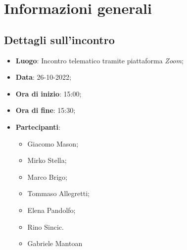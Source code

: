 \section{Informazioni generali}

\subsection{Dettagli sull'incontro}
\begin{itemize}
\item \textbf{Luogo}: Incontro telematico tramite piattaforma \textit{Zoom};
\item \textbf{Data}: 26-10-2022;
\item \textbf{Ora di inizio}: 15:00;
\item \textbf{Ora di fine}: 15:30;
\item \textbf{Partecipanti}: 
\begin{itemize}
	\item Giacomo Mason;
	\item Mirko Stella;
	\item Marco Brigo;
	\item Tommaso Allegretti;
	\item Elena Pandolfo;
	\item Rino Sincic.
	\item Gabriele Mantoan
\end{itemize}
\end{itemize}

